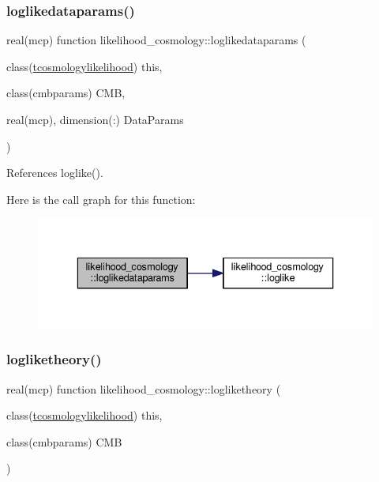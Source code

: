 \subsubsection{\texorpdfstring{loglikedataparams()}{loglikedataparams()}}
{\footnotesize\ttfamily real(mcp) function likelihood\+\_\+cosmology\+::loglikedataparams (\begin{DoxyParamCaption}\item[{class(\mbox{\hyperlink{structlikelihood__cosmology_1_1tcosmologylikelihood}{tcosmologylikelihood}})}]{this,  }\item[{class(cmbparams)}]{C\+MB,  }\item[{real(mcp), dimension(\+:)}]{Data\+Params }\end{DoxyParamCaption})\hspace{0.3cm}{\ttfamily [private]}}



References loglike().

Here is the call graph for this function\+:
\nopagebreak
\begin{figure}[H]
\begin{center}
\leavevmode
\includegraphics[width=336pt]{namespacelikelihood__cosmology_a1b2ee95e5e883485f7ba0635f9a5beef_cgraph}
\end{center}
\end{figure}
\mbox{\label{namespacelikelihood__cosmology_adfac1b06d8d335f24e427fe3629f706c}} 
\subsubsection{\texorpdfstring{logliketheory()}{logliketheory()}}
{\footnotesize\ttfamily real(mcp) function likelihood\+\_\+cosmology\+::logliketheory (\begin{DoxyParamCaption}\item[{class(\mbox{\hyperlink{structlikelihood__cosmology_1_1tcosmologylikelihood}{tcosmologylikelihood}})}]{this,  }\item[{class(cmbparams)}]{C\+MB }\end{DoxyParamCaption})\hspace{0.3cm}{\ttfamily [private]}}



